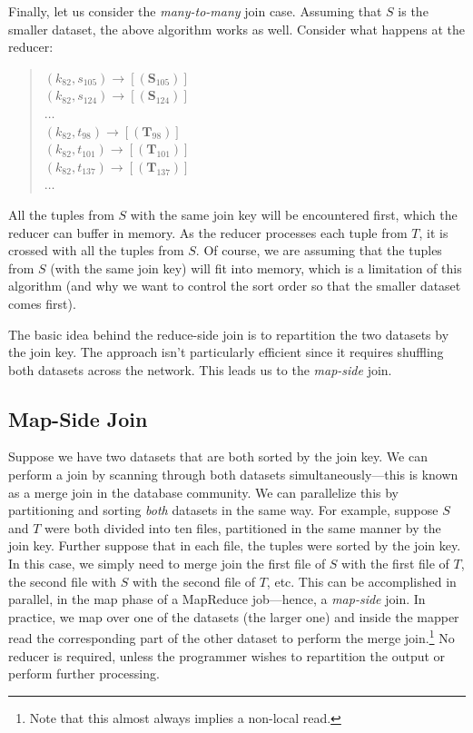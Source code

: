 Finally, let us consider the \emph{many-to-many} join case.  Assuming
that $S$ is the smaller dataset, the above algorithm works as well.
Consider what happens at the reducer:

\begin{quote}
$(k_{82}, s_{105}) \rightarrow [(\textbf{S}_{105})]$ \\
$(k_{82}, s_{124}) \rightarrow [(\textbf{S}_{124})]$ \\
$\ldots$ \\
$(k_{82}, t_{98})  \rightarrow [(\textbf{T}_{98})]$ \\
$(k_{82}, t_{101}) \rightarrow [(\textbf{T}_{101})]$ \\
$(k_{82}, t_{137}) \rightarrow [(\textbf{T}_{137})]$ \\
$\ldots$
\end{quote}

\noindent All the tuples from $S$ with the same join key will be
encountered first, which the reducer can buffer in memory.  As the
reducer processes each tuple from $T$, it is crossed with all the
tuples from $S$.  Of course, we are assuming that the tuples from $S$
(with the same join key) will fit into memory, which is a limitation
of this algorithm (and why we want to control the sort order so that
the smaller dataset comes first).

The basic idea behind the reduce-side join is to repartition the two
datasets by the join key.  The approach isn't particularly efficient
since it requires shuffling both datasets across the network.  This
leads us to the \emph{map-side} join.

\subsection{Map-Side Join}

Suppose we have two datasets that are both sorted by the join key.  We
can perform a join by scanning through both datasets
simultaneously---this is known as a merge join in the database
community.  We can parallelize this by partitioning and sorting \emph{
  both} datasets in the same way.  For example, suppose $S$ and $T$
were both divided into ten files, partitioned in the same manner by
the join key.  Further suppose that in each file, the tuples were
sorted by the join key.  In this case, we simply need to merge join
the first file of $S$ with the first file of $T$, the second file with
$S$ with the second file of $T$, etc.  This can be accomplished in
parallel, in the map phase of a MapReduce job---hence, a \emph{
  map-side} join.  In practice, we map over one of the datasets (the
larger one) and inside the mapper read the corresponding part of the
other dataset to perform the merge join.\footnote{Note that this
  almost always implies a non-local read.}  No reducer is required,
unless the programmer wishes to repartition the output or perform
further processing.

